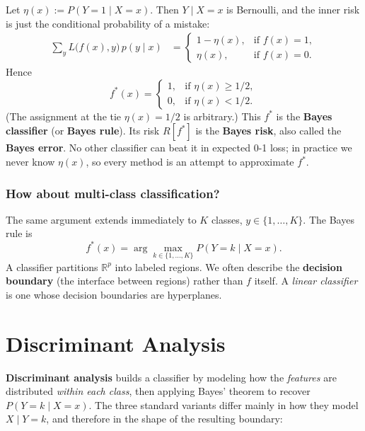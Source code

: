 \documentclass[
]{book}
\begin{document}
Let \(\eta(x) := P(Y = 1 \mid X = x)\). Then \(Y \mid X = x\) is Bernoulli, and the inner risk is just the conditional probability of a mistake:
\begin{align*}
\sum_{y} L\bigl(f(x), y\bigr)\, p(y \mid x)
&=
\begin{cases}
1 - \eta(x), & \text{if } f(x) = 1,\\
\eta(x),     & \text{if } f(x) = 0.
\end{cases}
\end{align*}
Hence
\[
f^*(x) =
\begin{cases}
1, & \text{if } \eta(x) \ge 1/2,\\
0, & \text{if } \eta(x) < 1/2.
\end{cases}
\]
(The assignment at the tie \(\eta(x) = 1/2\) is arbitrary.) This \(f^*\) is the \textbf{Bayes classifier} (or \textbf{Bayes rule}). Its risk \(R[f^*]\) is the \textbf{Bayes risk}, also called the \textbf{Bayes error}. No other classifier can beat it in expected 0-1 loss; in practice we never know \(\eta(x)\), so every method is an attempt to approximate \(f^*\).

\subsubsection*{How about multi-class classification?}\label{how-about-multi-class-classification}

The same argument extends immediately to \(K\) classes, \(y \in \{1, \ldots, K\}\). The Bayes rule is
\[
f^*(x) = \arg\max_{k \in \{1,\ldots,K\}} P(Y = k \mid X = x).
\]
A classifier partitions \(\mathbb{R}^p\) into labeled regions. We often describe the \textbf{decision boundary} (the interface between regions) rather than \(f\) itself. A \emph{linear classifier} is one whose decision boundaries are hyperplanes.

\section{Discriminant Analysis}\label{discriminant-analysis}

\textbf{Discriminant analysis} builds a classifier by modeling how the \emph{features} are distributed \emph{within each class}, then applying Bayes' theorem to recover \(P(Y = k \mid X = x)\). The three standard variants differ mainly in how they model \(X \mid Y = k\), and therefore in the shape of the resulting boundary:
\end{document}
